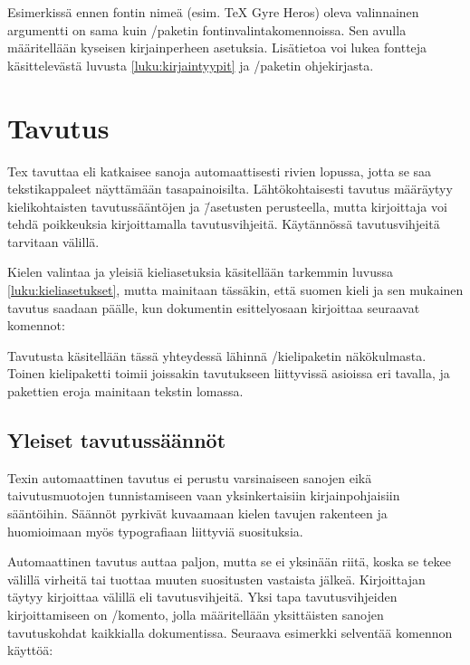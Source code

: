 Esimerkissä ennen fontin nimeä (esim. TeX Gyre Heros) oleva valinnainen
argumentti on sama kuin \-/paketin
fontinvalintakomennoissa. Sen avulla määritellään kyseisen
kirjainperheen asetuksia. Lisätietoa voi lukea fontteja käsittelevästä
luvusta \ref{luku:kirjaintyypit} ja \-/paketin
ohjekirjasta.

\section{Tavutus}
\label{luku:tavutus}

Tex tavuttaa eli katkaisee sanoja automaattisesti rivien lopussa, jotta
se saa tekstikappaleet näyttämään tasapainoisilta. Lähtökohtaisesti
tavutus määräytyy kielikohtaisten tavutussääntöjen ja \=/asetusten
perusteella, mutta kirjoittaja voi tehdä poikkeuksia kirjoittamalla
tavutusvihjeitä. Käytännössä tavutusvihjeitä tarvitaan välillä.

Kielen valintaa ja yleisiä kieliasetuksia käsitellään tarkemmin luvussa
\ref{luku:kieliasetukset}, mutta mainitaan tässäkin, että suomen kieli
ja sen mukainen tavutus saadaan päälle, kun dokumentin esittelyosaan
kirjoittaa seuraavat komennot:

\begin{koodilohkosis}
  \usepackage{polyglossia}
  \setdefaultlanguage{finnish}
\end{koodilohkosis}

Tavutusta käsitellään tässä yhteydessä lähinnä
\-/kielipaketin näkökulmasta. Toinen kielipaketti
 toimii joissakin tavutukseen liittyvissä asioissa eri
tavalla, ja pakettien eroja mainitaan tekstin lomassa.

\subsection{Yleiset tavutussäännöt}

Texin automaattinen tavutus ei perustu varsinaiseen sanojen eikä
taivutusmuotojen tunnistamiseen vaan yksinkertaisiin kirjainpohjaisiin
sääntöihin. Säännöt pyrkivät kuvaamaan kielen tavujen rakenteen ja
huomioimaan myös typografiaan liittyviä suosituksia.

Automaattinen tavutus auttaa paljon, mutta se ei yksinään riitä, koska
se tekee välillä virheitä tai tuottaa muuten suositusten vastaista
jälkeä. Kirjoittajan täytyy kirjoittaa välillä eli tavutusvihjeitä. Yksi
tapa tavutusvihjeiden kirjoittamiseen on \-/komento, jolla määritellään yksittäisten sanojen
tavutuskohdat kaikkialla dokumentissa. Seuraava esimerkki selventää
komennon käyttöä:

